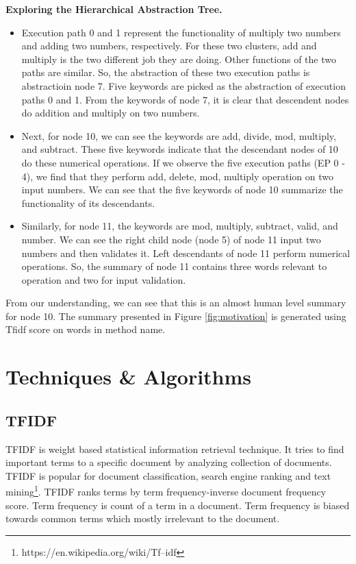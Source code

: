 \textbf{Exploring the Hierarchical Abstraction Tree.}
\begin{itemize}
    \item Execution path 0 and 1 represent the functionality of multiply two numbers and adding two numbers, respectively. For these two clusters, add and multiply is the two different job they are doing. Other functions of the two paths are similar. So, the abstraction of these two execution paths is abstractioin node 7. Five keywords are picked as the abstraction of execution paths 0 and 1. From the keywords of node 7, it is clear that descendent nodes do addition and multiply on two numbers.
    \item Next, for node 10, we can see the keywords are add, divide, mod, multiply, and subtract. These five keywords indicate that the descendant nodes of 10 do these numerical operations. If we observe the five execution paths (EP 0 - 4), we find that they perform add, delete, mod, multiply operation on two input numbers. We can see that the five keywords of node 10 summarize the functionality of its descendants.
    \item Similarly, for node 11, the keywords are mod, multiply, subtract, valid, and number. We can see the right child node (node 5) of node 11 input two numbers and then validates it. Left descendants of node 11 perform numerical operations. So, the summary of node 11 contains three words relevant to operation and two for input validation.
\end{itemize}
   From our understanding, we can see that this is an almost human level summary for node 10. The summary presented in Figure \ref{fig:motivation} is generated using Tfidf score on words in method name. 

\section{ Techniques \& Algorithms}
\label{background:techniques}
\subsection{TFIDF}
TFIDF is weight based statistical information retrieval technique. It tries to find important terms to a specific document by analyzing collection of documents. TFIDF is popular for document classification, search engine ranking and text mining\footnote{https://en.wikipedia.org/wiki/Tf–idf}. TFIDF ranks terms by term frequency-inverse document frequency score. Term frequency is count of a term in a document. Term frequency is biased towards common terms which mostly irrelevant to the document. 

